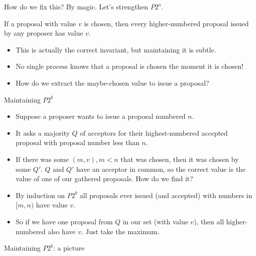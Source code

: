 \documentclass{beamer}
\begin{document}
\begin{frame}{How do we fix this? By magic.}
  Let's strengthen $P2^a$.

  \begin{invariant}[$P2^b$]
    If a proposal with value $v$ is chosen, then every higher-numbered proposal \alert{issued} by any proposer has value $v$.
  \end{invariant}

  \begin{itemize}
    \item This is actually the correct invariant, but maintaining it is subtle.
    \item No single process knows that a proposal is chosen the moment it is chosen!
    \item How do we extract the maybe-chosen value to issue a proposal?
  \end{itemize}
\end{frame}

\begin{frame}{Maintaining $P2^b$}
  \begin{itemize}
    \item Suppose a proposer wants to issue a proposal numbered $n$.
    \item It asks a majority $Q$ of acceptors for their \alert{highest-numbered accepted proposal} with proposal number \alert{less than $n$}.
    \item If there was some $(m, v), m < n$ that was chosen, then it was chosen by some $Q'$. $Q$ and $Q'$ have an acceptor in common, so the correct value is the value of one of our gathered proposals. How do we find it?
    \item By induction on $P2^b$ all proposals ever issued (and accepted) with numbers in $[m, n)$ have value $v$.
    \item So if we have one proposal from $Q$ in our set (with value $v$), then all higher-numbered also have $v$. Just take the maximum.
  \end{itemize}
\end{frame}

\begin{frame}{Maintaining $P2^b$: a picture}
  \begin{figure}[!h]
  \centering
  \end{figure}
\end{frame}
\end{document}
